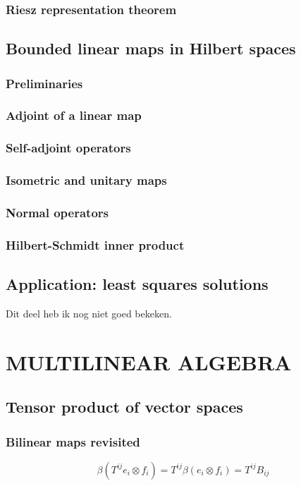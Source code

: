 \documentclass[a4paper,twoside]{article}
\theoremstyle{definition}
\theoremstyle{plain}
\begin{document}
\subsubsection{Riesz representation theorem}
\subsection{Bounded linear maps in Hilbert spaces}
\subsubsection{Preliminaries}
\subsubsection{Adjoint of a linear map}
\subsubsection{Self-adjoint operators}
\subsubsection{Isometric and unitary maps}
\subsubsection{Normal operators}
\subsubsection{Hilbert-Schmidt inner product}
\subsection{Application: least squares solutions}
Dit deel heb ik nog niet goed bekeken.

\section{MULTILINEAR ALGEBRA}
\subsection{Tensor product of vector spaces}
\subsubsection{Bilinear maps revisited}
\[\beta (T^{ij} e_i \otimes f_i) = T^{ij}\beta(e_i \otimes f_i) = T^{ij}B_{ij}\]
\end{document}

